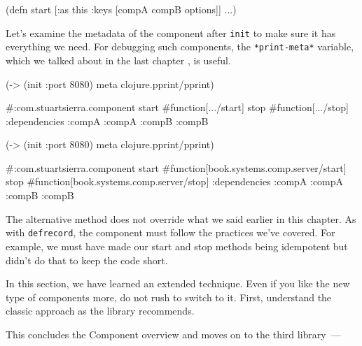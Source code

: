 \else

\begin{english}
  \begin{clojure}
(defn start
  [{:as this :keys [compA compB options]}]
  ...)
  \end{clojure}
\end{english}

\fi

Let's examine the metadata of the component after \verb|init| to make sure it has everything we need. For debugging such components, the \verb|*print-meta*| variable, which we talked about in the last chapter , is useful.

\ifnarrow

\begin{english}
  \begin{clojure}
(-> (init {:port 8080})
    meta
    clojure.pprint/pprint)

#:com.stuartsierra.component
 {start #function[.../start]
  stop  #function[.../stop]
  :dependencies
  {:compA :compA :compB :compB}}
  \end{clojure}
\end{english}

\else

\begin{english}
  \begin{clojure}
(-> (init {:port 8080})
    meta
    clojure.pprint/pprint)

#:com.stuartsierra.component
  {start #function[book.systems.comp.server/start]
   stop #function[book.systems.comp.server/stop]
   :dependencies {:compA :compA :compB :compB}}
  \end{clojure}
\end{english}

\fi


The alternative method does not override what we said earlier in this chapter. As with \verb|defrecord|, the component must follow the practices we've covered. For example, we must have made our start and stop methods being idempotent but didn't do that to keep the code short.

In this section, we have learned an extended technique. Even if you like the new type of components more, do not rush to switch to it. First, understand the classic approach as the library recommends.

This concludes the Component overview and moves on to the third library~---

